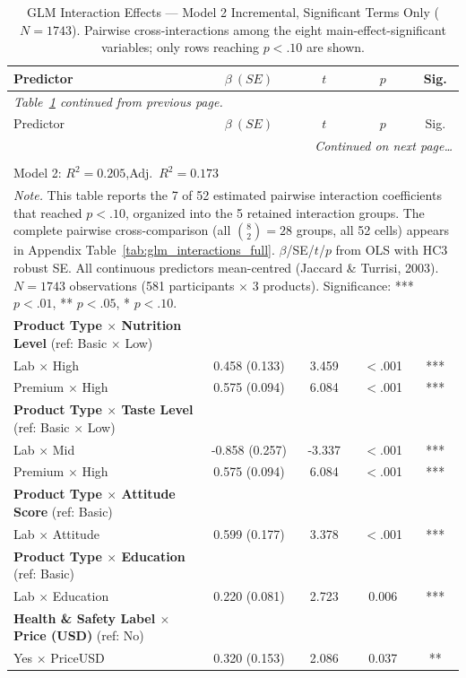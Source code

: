 \begin{center}
\begin{longtable}{lcccc}
\caption{GLM Interaction Effects --- Model 2 Incremental, Significant Terms Only ($N=1743$). Pairwise cross-interactions among the eight main-effect-significant variables; only rows reaching $p<.10$ are shown.}\label{tab:glm_interactions} \\
\toprule
Predictor & $\beta\ (SE)$ & $t$ & $p$ & Sig. \\
\midrule
\endfirsthead
\multicolumn{5}{l}{\textit{Table~\ref{tab:glm_interactions} continued from previous page.}} \\
\toprule
Predictor & $\beta\ (SE)$ & $t$ & $p$ & Sig. \\
\midrule
\endhead
\midrule
\multicolumn{5}{r}{\textit{Continued on next page\ldots}} \\
\endfoot
\multicolumn{5}{l}{$\Delta R^2 = 0.059$,\quad $F$\text{-change}$(37,\ 1674) = 3.37$,\quad $p < .001$} \\
\multicolumn{5}{l}{Model 2: $R^2 = 0.205$,\quad Adj.\ $R^2 = 0.173$} \\
\bottomrule
\multicolumn{5}{p{0.95\linewidth}}{\footnotesize \textit{Note.} This table reports the 7 of 52 estimated pairwise interaction coefficients that reached $p<.10$, organized into the 5 retained interaction groups. The complete pairwise cross-comparison (all $\binom{8}{2} = 28$ groups, all 52 cells) appears in Appendix Table~\ref{tab:glm_interactions_full}. $\beta$/SE/$t$/$p$ from OLS with HC3 robust SE. All continuous predictors mean-centred (Jaccard \& Turrisi, 2003). $N=1743$ observations (581 participants $\times$ 3 products). Significance: *** $p<.01$, ** $p<.05$, * $p<.10$.}} \\
\endlastfoot
\quad \textbf{Product Type $\times$ Nutrition Level} (ref: Basic $\times$ Low) & & & & \\
\qquad Lab $\times$ High & 0.458 (0.133) & 3.459 & $<$.001 & *** \\
\qquad Premium $\times$ High & 0.575 (0.094) & 6.084 & $<$.001 & *** \\
\quad \textbf{Product Type $\times$ Taste Level} (ref: Basic $\times$ Low) & & & & \\
\qquad Lab $\times$ Mid & -0.858 (0.257) & -3.337 & $<$.001 & *** \\
\qquad Premium $\times$ High & 0.575 (0.094) & 6.084 & $<$.001 & *** \\
\quad \textbf{Product Type $\times$ Attitude Score} (ref: Basic) & & & & \\
\qquad Lab $\times$ Attitude & 0.599 (0.177) & 3.378 & $<$.001 & *** \\
\quad \textbf{Product Type $\times$ Education} (ref: Basic) & & & & \\
\qquad Lab $\times$ Education & 0.220 (0.081) & 2.723 & 0.006 & *** \\
\quad \textbf{Health \& Safety Label $\times$ Price (USD)} (ref: No) & & & & \\
\qquad Yes $\times$ PriceUSD & 0.320 (0.153) & 2.086 & 0.037 & ** \\
\end{longtable}
\end{center}